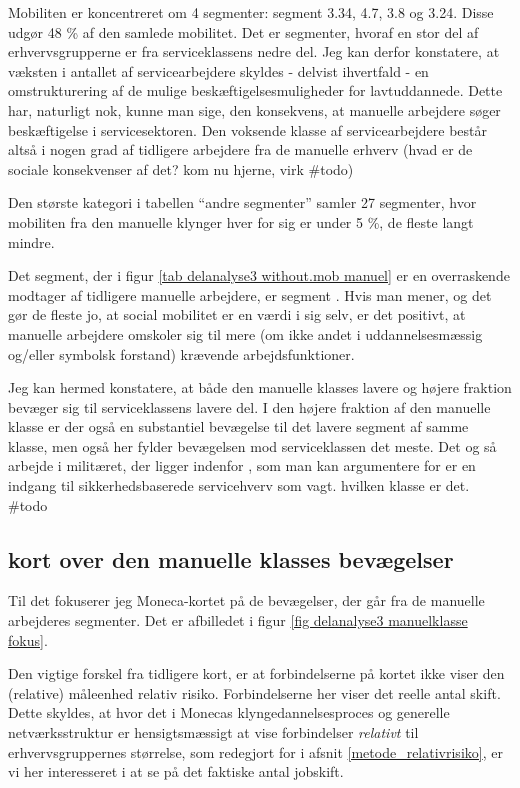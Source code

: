 Mobiliten er koncentreret om 4 segmenter: segment 3.34, 4.7, 3.8 og 3.24. Disse udgør 48 \% af den samlede mobilitet. Det er segmenter, hvoraf en stor del af erhvervsgrupperne er fra serviceklassens nedre del. Jeg kan derfor konstatere, at væksten i antallet af servicearbejdere skyldes -  delvist ihvertfald - en omstrukturering af de mulige beskæftigelsesmuligheder for lavtuddannede. Dette har, naturligt nok, kunne man sige, den konsekvens, at manuelle arbejdere søger beskæftigelse i servicesektoren. Den voksende klasse af servicearbejdere består altså i nogen grad af tidligere arbejdere fra de manuelle erhverv (hvad er de sociale konsekvenser af det? kom nu hjerne, virk \#todo)

Den største kategori i tabellen “andre segmenter” samler 27 segmenter, hvor mobiliten fra den manuelle klynger hver for sig er under 5 \%, de fleste langt mindre. 


Det segment, der i figur \ref{tab delanalyse3 without.mob manuel} er en overraskende modtager af tidligere manuelle arbejdere, er segment . Hvis man mener, og det gør de fleste jo, at social mobilitet er en værdi i sig selv, er det positivt, at manuelle arbejdere omskoler sig til mere (om ikke andet i uddannelsesmæssig og/eller symbolsk forstand) krævende arbejdsfunktioner.


Jeg kan hermed konstatere, at både den manuelle klasses lavere og højere fraktion bevæger sig til serviceklassens lavere del. I den højere fraktion af den manuelle klasse er der også en substantiel bevægelse til det lavere segment af samme klasse, men også her fylder bevægelsen mod serviceklassen det meste. Det og så arbejde i militæret, der ligger indenfor , som man kan argumentere for er en indgang til sikkerhedsbaserede servicehverv som vagt. hvilken klasse er det. \#todo







%
\subsection{kort over den manuelle klasses bevægelser}
%

Til det fokuserer jeg Moneca-kortet på de bevægelser, der går fra de manuelle arbejderes segmenter. Det er afbilledet i figur \ref{fig delanalyse3 manuelklasse fokus}.

Den vigtige forskel fra tidligere kort, er at forbindelserne på kortet ikke viser den (relative) måleenhed relativ risiko. Forbindelserne her viser det reelle antal skift. Dette skyldes, at hvor det i Monecas klyngedannelsesproces og generelle netværksstruktur er hensigtsmæssigt at vise forbindelser \emph{relativt} til erhvervsgruppernes størrelse, som redegjort for i afsnit \ref{metode_relativrisiko}, er vi her interesseret i at se på det faktiske antal jobskift. 




